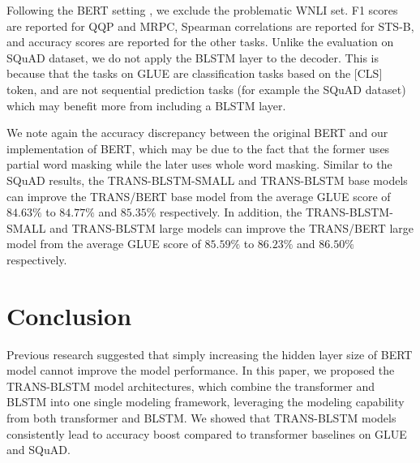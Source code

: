 \documentclass[11pt,a4paper]{article}
\begin{document}
Following the BERT setting \cite{devlin2018}, we exclude the problematic WNLI set. F1 scores are reported for QQP and MRPC, Spearman correlations are reported for STS-B, and accuracy scores are reported for the other tasks. Unlike the evaluation on SQuAD dataset, we do not apply the BLSTM layer to the decoder. This is because that the tasks on GLUE are classification tasks based on the [CLS] token, and are not sequential prediction tasks (for example the SQuAD dataset) which may benefit more from including a BLSTM layer. 

We note again the accuracy discrepancy between the original BERT and our implementation of BERT, which may be due to the fact that the former uses partial word masking while the later uses whole word masking. Similar to the SQuAD results, the TRANS-BLSTM-SMALL and TRANS-BLSTM base models can improve the TRANS/BERT base model from the average GLUE score of $84.63\%$ to $84.77\%$ and $85.35\%$ respectively. In addition, the TRANS-BLSTM-SMALL and TRANS-BLSTM large models can improve the TRANS/BERT large model from the average GLUE score of $85.59\%$ to $86.23\%$ and $86.50\%$ respectively.


\section{Conclusion}
 Previous research suggested that simply increasing the hidden layer size of BERT model cannot improve the model performance. In this paper, we proposed the TRANS-BLSTM model architectures, which combine the transformer and BLSTM into one single modeling framework, leveraging the modeling capability from both transformer and BLSTM. We showed that TRANS-BLSTM models consistently lead to accuracy boost compared to transformer baselines on GLUE and SQuAD. 










\end{document}
